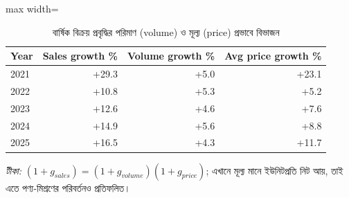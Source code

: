 \begin{table}[htbp]
\centering
\small
\caption{বার্ষিক বিক্রয় প্রবৃদ্ধির পরিমাণ (volume) ও মূল্য (price) প্রভাবে বিভাজন}
\label{tab:pricevolume}
\begin{adjustbox}{max width=\linewidth}
\begin{tabular}{lrrr}
\toprule
\textbf{Year} & \textbf{Sales growth \%} & \textbf{Volume growth \%} & \textbf{Avg price growth \%} \\
\midrule
2021 & +29.3 & +5.0 & +23.1 \\
2022 & +10.8 & +5.3 & +5.2 \\
2023 & +12.6 & +4.6 & +7.6 \\
2024 & +14.9 & +5.6 & +8.8 \\
2025 & +16.5 & +4.3 & +11.7 \\
\bottomrule
\end{tabular}
\end{adjustbox}
\par\smallskip\parbox{0.92\linewidth}{\footnotesize\emph{টীকা:} $(1+g_{sales}) = (1+g_{volume})(1+g_{price})$; এখানে মূল্য মানে ইউনিটপ্রতি নিট আয়, তাই এতে পণ্য-মিশ্রণের পরিবর্তনও প্রতিফলিত।}
\end{table}